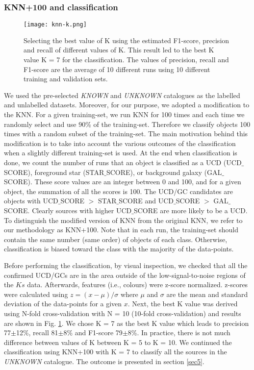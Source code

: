 \documentclass[fleqn,usenatbib]{mnras}
\begin{document}
\subsubsection{KNN+100 and classification}
\label{knn100}

\begin{figure}
\centering
\texttt{[image: knn-k.png]}
\caption{Selecting the best value of K using the estimated F1-score, precision and recall of different values of K. This result led to the best K value K = 7 for the classification. The values of precision, recall and F1-score are the average of 10 different runs using 10 different training and validation sets.}
\label{bestk}
\end{figure}

We used the pre-selected \textit{KNOWN} and \textit{UNKNOWN} catalogues as the labelled and unlabelled datasets. Moreover, for our purpose, we adopted a modification to the KNN. For a given training-set, we run KNN for 100 times and each time we randomly select and use 90\% of the training-set. Therefore we classify objects 100 times with a random subset of the training-set. The main motivation behind this modification is to take into account the various outcomes of the classification when a slightly different training-set is used. At the end when classification is done, we count the number of runs that an object is classified as a UCD (UCD$\_$SCORE), foreground star (STAR$\_$SCORE), or background galaxy (GAL$\_$SCORE). These score values are an integer between 0 and 100, and for a given object, the summation of all the scores is 100. The UCD/GC candidates are objects with UCD$\_$SCORE $>$ STAR$\_$SCORE and UCD$\_$SCORE $>$ GAL$\_$SCORE. Clearly sources with higher UCD$\_$SCORE are more likely to be a UCD. To distinguish the modified version of KNN from the original KNN, we refer to our methodology as KNN+100. Note that in each run, the training-set should contain the same number (same order) of objects of each class. Otherwise, classification is biased toward the class with the majority of the data-points. 

Before performing the classification, by visual inspection, we checked that all the confirmed UCD/GCs are in the area outside of the low-signal-to-noise regions of the $Ks$ data. Afterwards, features (i.e., colours) were z-score normalized. z-scores were calculated using $z = (x-\mu)/\sigma$ where $\mu$ and $\sigma$ are the mean and standard deviation of the data-points for a given $x$. Next, the best K value was derived using N-fold cross-validation with N = 10 (10-fold cross-validation) and results are shown in Fig. \ref{bestk}. We chose K = 7 as the best K value which leads to precision 77$\pm$12\%, recall 81$\pm$8\% and F1-score 79$\pm$8\%. In practice, there is not much difference between values of K between K = 5 to K = 10. We continued the classification using KNN+100 with K = 7 to classify all the sources in the \textit{UNKNOWN} catalogue. The outcome is presented in section \ref{sec5}.
\end{document}
